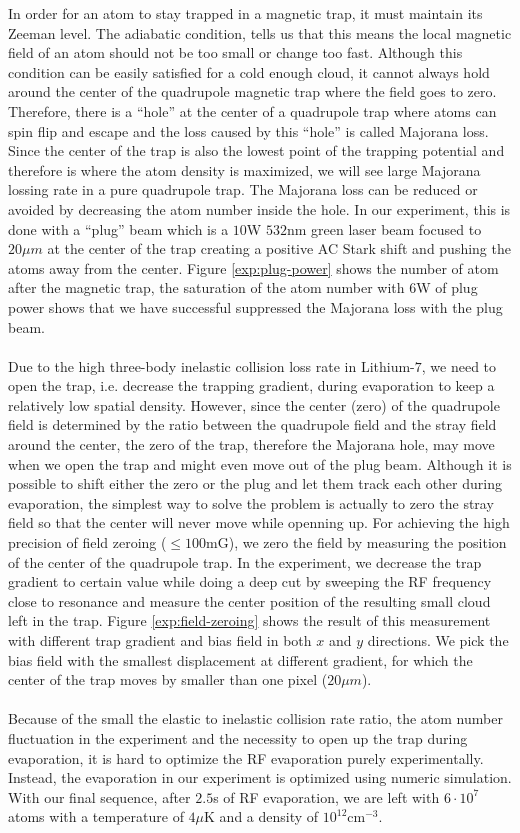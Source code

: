 In order for an atom to stay trapped in a magnetic trap, it must maintain its Zeeman level. The adiabatic condition, tells us that this means the local magnetic field of an atom should not be too small or change too fast. Although this condition can be easily satisfied for a cold enough cloud, it cannot always hold around the center of the quadrupole magnetic trap where the field goes to zero. Therefore, there is a ``hole'' at the center of a quadrupole trap where atoms can spin flip and escape and the loss caused by this ``hole'' is called Majorana loss. Since the center of the trap is also the lowest point of the trapping potential and therefore is where the atom density is maximized, we will see large Majorana lossing rate in a pure quadrupole trap. The Majorana loss can be reduced or avoided by decreasing the atom number inside the hole. In our experiment, this is done with a ``plug'' beam which is a $10$W $532$nm green laser beam focused to $20\mu m$ at the center of the trap creating a positive AC Stark shift and pushing the atoms away from the center. Figure \ref{exp:plug-power} shows the number of atom after the magnetic trap, the saturation of the atom number with $6$W of plug power shows that we have successful suppressed the Majorana loss with the plug beam.\\
\\
Due to the high three-body inelastic collision loss rate in Lithium-$7$, we need to open the trap, i.e. decrease the trapping gradient, during evaporation to keep a relatively low spatial density. However, since the center (zero) of the quadrupole field is determined by the ratio between the quadrupole field and the stray field around the center, the zero of the trap, therefore the Majorana hole, may move when we open the trap and might even move out of the plug beam. Although it is possible to shift either the zero or the plug and let them track each other during evaporation, the simplest way to solve the problem is actually to zero the stray field so that the center will never move while openning up. For achieving the high precision of field zeroing ($\leqslant100\text{mG}$), we zero the field by measuring the position of the center of the quadrupole trap. In the experiment, we decrease the trap gradient to certain value while doing a deep cut by sweeping the RF frequency close to resonance and measure the center position of the resulting small cloud left in the trap. Figure \ref{exp:field-zeroing} shows the result of this measurement with different trap gradient and bias field in both $x$ and $y$ directions. We pick the bias field with the smallest displacement at different gradient, for which the center of the trap moves by smaller than one pixel ($20\mu m$).\\
\\
Because of the small the elastic to inelastic collision rate ratio, the atom number fluctuation in the experiment and the necessity to open up the trap during evaporation, it is hard to optimize the RF evaporation purely experimentally. Instead, the evaporation in our experiment is optimized using numeric simulation. With our final sequence, after $2.5$s of RF evaporation, we are left with $6\cdot10^7$ atoms with a temperature of $4\mu$K and a density of $10^{12}\text{cm}^{-3}$.

